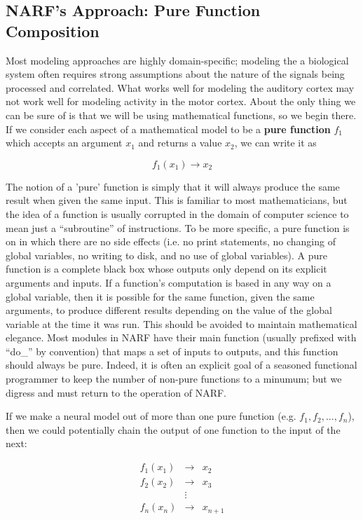 \documentclass[letterpaper]{report}
\newcommand{\definition}[1]{\textbf{#1}}
\begin{document}
\subsection{NARF's Approach: Pure Function Composition}

Most modeling approaches are highly domain-specific; modeling the a biological system often requires strong assumptions about the nature of the signals being processed and correlated. What works well for modeling the auditory cortex may not work well for modeling activity in the motor cortex. About the only thing we can be sure of is that we will be using mathematical functions, so we begin there. If we consider each aspect of a mathematical model to be a \definition{pure function} $f_1$ which accepts an argument $x_1$ and returns a value $x_2$, we can write it as

\begin{equation}
  f_1(x_1) \rightarrow x_2
\end{equation}

The notion of a 'pure' function is simply that it will always produce the same result when given the same input. This is familiar to most mathematicians, but the idea of a function is usually corrupted in the domain of computer science to mean just a ``subroutine'' of instructions. To be more specific, a pure function is on in which there are no side effects (i.e. no print statements, no changing of global variables, no writing to disk, and no use of global variables). A pure function is a complete black box whose outputs only depend on its explicit arguments and inputs. If a function's computation is based in any way on a global variable, then it is possible for the same function, given the same arguments, to produce different results depending on the value of the global variable at the time it was run. This should be avoided to maintain mathematical elegance. Most modules in NARF have their main function (usually prefixed with ``do\_'' by convention) that maps a set of inputs to outputs, and this function should always be pure. Indeed, it is often an explicit goal of a seasoned functional programmer to keep the number of non-pure functions to a minumum; but we digress and must return to the operation of NARF. 

If we make a neural model out of more than one pure function (e.g. $f_1, f_2, ..., f_n$), then we could potentially chain the output of one function to the input of the next:

\begin{eqnarray*}
f_{1}(x_{1}) & \rightarrow & x_{2}\\
f_{2}(x_{2}) & \rightarrow & x_{3}\\
 & \vdots\\
f_{n}(x_{n}) & \rightarrow & x_{n+1}
\end{eqnarray*}
\end{document}

